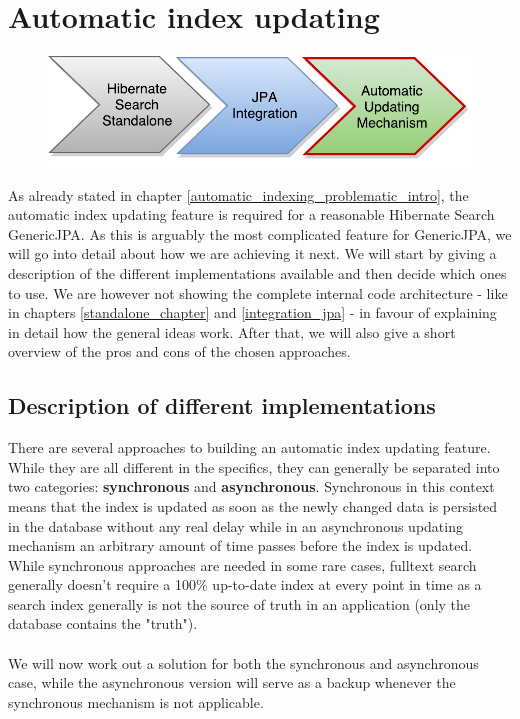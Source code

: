 
\section{Automatic index updating} \label{automatic_indexing_chapter}

\begin{figure}[ht]
	\centering
	\includegraphics[scale=0.75]{images/timeline_genericjpa_third.pdf}
	\label{project_timeline_third}
\end{figure}
\noindent
As already stated in chapter \ref{automatic_indexing_problematic_intro}, the automatic index updating feature is required for a reasonable Hibernate Search GenericJPA. As this is arguably the most complicated feature for GenericJPA, we will go into detail about how we are achieving it next. We will start by giving a description of the different implementations available and then decide which ones to use. We are however not showing the complete internal code architecture - like in chapters \ref{standalone_chapter} and \ref{integration_jpa} - in favour of explaining in detail how the general ideas work. After that, we will also give a short overview of the pros and cons of the chosen approaches. 

\pagebreak

\subsection{Description of different implementations} \label{description_of_different_implementations}

There are several approaches to building an automatic index updating feature. While they are all different in the specifics, they can generally be separated into two categories: \textbf{synchronous} and \textbf{asynchronous}. Synchronous in this context means that the index is updated as soon as the newly changed data is persisted in the database without any real delay while in an asynchronous updating mechanism an arbitrary amount of time passes before the index is updated. While synchronous approaches are needed in some rare cases, fulltext search generally doesn't require a 100\% up-to-date index at every point in time  as a search index generally is not the source of truth in an application (only the database contains the "truth").
\\\\
We will now work out a solution for both the synchronous and asynchronous case, while the asynchronous version will serve as a backup whenever the synchronous mechanism is not applicable.

